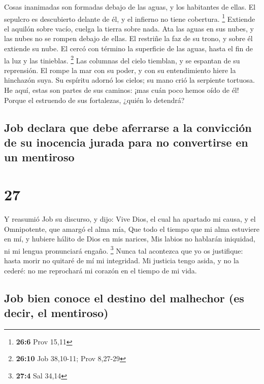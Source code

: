  Cosas inanimadas son formadas debajo de las aguas, y los
habitantes de ellas.  El sepulcro es descubierto delante
de él, y el infierno no tiene cobertura. \footnote{\textbf{26:6} Prov
  15,11}  Extiende el aquilón sobre vacío, cuelga la
tierra sobre nada.  Ata las aguas en sus nubes, y las
nubes no se rompen debajo de ellas.  El restriñe la faz de
su trono, y sobre él extiende su nube.  El cercó con
término la superficie de las aguas, hasta el fin de la luz y las
tinieblas. \footnote{\textbf{26:10} Job 38,10-11; Prov 8,27-29}
 Las columnas del cielo tiemblan, y se espantan de su
reprensión.  El rompe la mar con su poder, y con su
entendimiento hiere la hinchazón suya.  Su espíritu
adornó los cielos; su mano crió la serpiente tortuosa. 
He aquí, estas son partes de sus caminos: ¡mas cuán poco hemos oído de
él! Porque el estruendo de sus fortalezas, ¿quién lo detendrá?

\hypertarget{job-declara-que-debe-aferrarse-a-la-convicciuxf3n-de-su-inocencia-jurada-para-no-convertirse-en-un-mentiroso}{%
\subsection{Job declara que debe aferrarse a la convicción de su
inocencia jurada para no convertirse en un
mentiroso}\label{job-declara-que-debe-aferrarse-a-la-convicciuxf3n-de-su-inocencia-jurada-para-no-convertirse-en-un-mentiroso}}

\hypertarget{section-26}{%
\section{27}\label{section-26}}

 Y reasumió Job su discurso, y dijo:  Vive
Dios, el cual ha apartado mi causa, y el Omnipotente, que amargó el alma
mía,  Que todo el tiempo que mi alma estuviere en mí, y
hubiere hálito de Dios en mis narices,  Mis labios no
hablarán iniquidad, ni mi lengua pronunciará engaño. \footnote{\textbf{27:4}
  Sal 34,14}  Nunca tal acontezca que yo os justifique:
hasta morir no quitaré de mí mi integridad.  Mi justicia
tengo asida, y no la cederé: no me reprochará mi corazón en el tiempo de
mi vida.

\hypertarget{job-bien-conoce-el-destino-del-malhechor-es-decir-el-mentiroso}{%
\subsection{Job bien conoce el destino del malhechor (es decir, el
mentiroso)}\label{job-bien-conoce-el-destino-del-malhechor-es-decir-el-mentiroso}}

